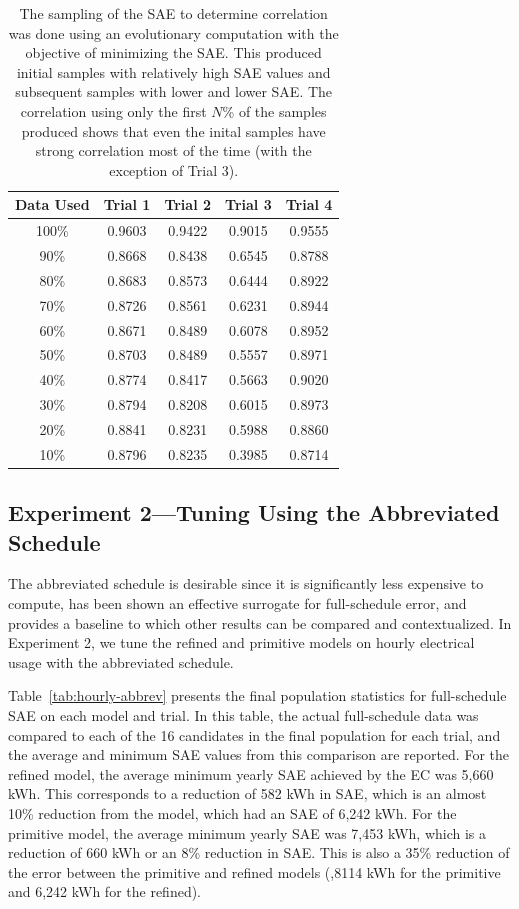 \documentclass[preprint, review, 12pt]{elsarticle}
\begin{document}
\begin{table}[htbp]
\centering
\caption{The sampling of the SAE to determine correlation was done using an evolutionary computation with the objective of minimizing the SAE. This produced initial samples with relatively high SAE values and subsequent samples with lower and lower SAE. The correlation using only the first $N$\% of the samples produced shows that even the inital samples have strong correlation most of the time (with the exception of Trial 3).}
\label{tab:hour-corr}
\begin{tabular}{ccccc}
\toprule
Data Used & Trial 1 & Trial 2 & Trial 3 & Trial 4\\
\midrule
100\% & 0.9603 & 0.9422 & 0.9015 & 0.9555\\\rowcolor{DarkRow}
90\%  & 0.8668 & 0.8438 & 0.6545 & 0.8788\\
80\%  & 0.8683 & 0.8573 & 0.6444 & 0.8922\\\rowcolor{DarkRow}
70\%  & 0.8726 & 0.8561 & 0.6231 & 0.8944\\
60\%  & 0.8671 & 0.8489 & 0.6078 & 0.8952\\\rowcolor{DarkRow}
50\%  & 0.8703 & 0.8489 & 0.5557 & 0.8971\\
40\%  & 0.8774 & 0.8417 & 0.5663 & 0.9020\\\rowcolor{DarkRow}
30\%  & 0.8794 & 0.8208 & 0.6015 & 0.8973\\
20\%  & 0.8841 & 0.8231 & 0.5988 & 0.8860\\\rowcolor{DarkRow}
10\%  & 0.8796 & 0.8235 & 0.3985 & 0.8714\\
\bottomrule
\end{tabular}
\end{table}


\subsection{Experiment 2---Tuning Using the Abbreviated Schedule}
\label{sub:experiment2}
The abbreviated schedule is desirable since it is significantly less expensive to compute, has been shown an effective surrogate for full-schedule error, and provides a baseline to which other results can be compared and contextualized. In Experiment 2, we tune the refined and primitive models on hourly electrical usage with the abbreviated schedule. 

Table~\ref{tab:hourly-abbrev} presents the final population statistics for full-schedule SAE on each model and trial. In this table, the actual full-schedule data was compared to each of the 16 candidates in the final population for each trial, and the average and minimum SAE values from this comparison are reported. For the refined model, the average minimum yearly SAE achieved by the EC was 5,660 kWh. This corresponds to a reduction of 582 kWh in SAE, which is an almost 10\% reduction from the model, which had an SAE of 6,242 kWh. For the primitive model, the average minimum yearly SAE was 7,453 kWh, which is a reduction of 660 kWh or an 8\% reduction in SAE. This is also a 35\% reduction of the error between the primitive and refined models (,8114 kWh for the primitive and 6,242 kWh for the refined).
\end{document}
